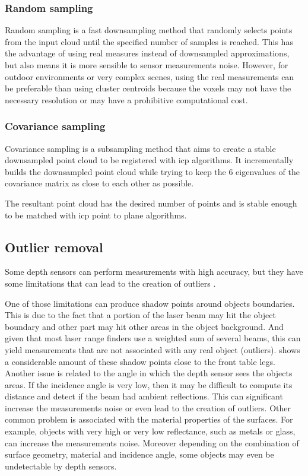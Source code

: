 \subsubsection{Random sampling}

Random sampling \cite{Vitter1984} is a fast downsampling method that randomly selects points from the input cloud until the specified number of samples is reached. This has the advantage of using real measures instead of downsampled approximations, but also means it is more sensible to sensor measurements noise. However, for outdoor environments or very complex scenes, using the real measurements can be preferable than using cluster centroids because the voxels may not have the necessary resolution or may have a prohibitive computational cost.


\subsubsection{Covariance sampling}

Covariance sampling \cite{Gelfand} is a subsampling method that aims to create a stable downsampled point cloud to be registered with \gls{icp} algorithms. It incrementally builds the downsampled point cloud while trying to keep the 6 eigenvalues of the covariance matrix as close to each other as possible.

The resultant point cloud has the desired number of points and is stable enough to be matched with \gls{icp} point to plane algorithms.


\subsection{Outlier removal}

Some depth sensors can perform measurements with high accuracy, but they have some limitations that can lead to the creation of outliers \cite{Sotoodeh2006}.

One of those limitations can produce shadow points around objects boundaries. This is due to the fact that a portion of the laser beam may hit the object boundary and other part may hit other areas in the object background. And given that most laser range finders use a weighted sum of several beams, this can yield measurements that are not associated with any real object (outliers).  shows a considerable amount of these shadow points close to the front table legs. Another issue is related to the angle in which the depth sensor sees the objects areas. If the incidence angle is very low, then it may be difficult to compute its distance and detect if the beam had ambient reflections. This can significant increase the measurements noise or even lead to the creation of outliers. Other common problem is associated with the material properties of the surfaces. For example, objects with very high or very low reflectance, such as metals or glass, can increase the measurements noise. Moreover depending on the combination of surface geometry, material and incidence angle, some objects may even be undetectable by depth sensors.


